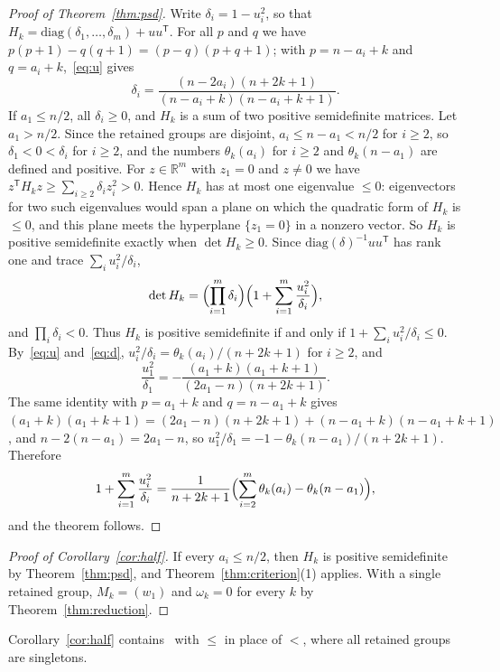 \documentclass[11pt]{amsart}
\theoremstyle{remark}
\numberwithin{equation}{section}
\newcommand{\R}{\mathbb R}
\begin{document}
\begin{proof}[Proof of Theorem~\ref{thm:psd}]
Write $\delta_i=1-u_i^2$, so that $H_k=\mathrm{diag}(\delta_1,\dots,\delta_m)+uu^{\mathsf T}$. For all $p$ and $q$ we have $p(p+1)-q(q+1)=(p-q)(p+q+1)$; with $p=n-a_i+k$ and $q=a_i+k$,~\eqref{eq:u} gives
\begin{equation}\label{eq:d}
\delta_i=\frac{(n-2a_i)(n+2k+1)}{(n-a_i+k)(n-a_i+k+1)}.
\end{equation}
If $a_1\le n/2$, all $\delta_i\ge0$, and $H_k$ is a sum of two positive semidefinite matrices. Let $a_1>n/2$. Since the retained groups are disjoint, $a_i\le n-a_1<n/2$ for $i\ge2$, so $\delta_1<0<\delta_i$ for $i\ge2$, and the numbers $\theta_k(a_i)$ for $i\ge2$ and $\theta_k(n-a_1)$ are defined and positive. For $z\in\R^m$ with $z_1=0$ and $z\ne0$ we have $z^{\mathsf T}H_kz\ge\sum_{i\ge2}\delta_iz_i^2>0$. Hence $H_k$ has at most one eigenvalue $\le0$: eigenvectors for two such eigenvalues would span a plane on which the quadratic form of $H_k$ is $\le0$, and this plane meets the hyperplane $\{z_1=0\}$ in a nonzero vector. So $H_k$ is positive semidefinite exactly when $\det H_k\ge0$. Since $\mathrm{diag}(\delta)^{-1}uu^{\mathsf T}$ has rank one and trace $\sum_iu_i^2/\delta_i$,
\[
\det H_k=\Bigl(\prod_{i=1}^m\delta_i\Bigr)\Bigl(1+\sum_{i=1}^m\frac{u_i^2}{\delta_i}\Bigr),
\]
and $\prod_i\delta_i<0$. Thus $H_k$ is positive semidefinite if and only if $1+\sum_iu_i^2/\delta_i\le0$. By~\eqref{eq:u} and~\eqref{eq:d}, $u_i^2/\delta_i=\theta_k(a_i)/(n+2k+1)$ for $i\ge2$, and
\[
\frac{u_1^2}{\delta_1}=-\frac{(a_1+k)(a_1+k+1)}{(2a_1-n)(n+2k+1)}.
\]
The same identity with $p=a_1+k$ and $q=n-a_1+k$ gives $(a_1+k)(a_1+k+1)=(2a_1-n)(n+2k+1)+(n-a_1+k)(n-a_1+k+1)$, and $n-2(n-a_1)=2a_1-n$, so $u_1^2/\delta_1=-1-\theta_k(n-a_1)/(n+2k+1)$. Therefore
\[
1+\sum_{i=1}^m\frac{u_i^2}{\delta_i}=\frac1{n+2k+1}\Bigl(\sum_{i=2}^m\theta_k(a_i)-\theta_k(n-a_1)\Bigr),
\]
and the theorem follows.
\end{proof}

\begin{proof}[Proof of Corollary~\ref{cor:half}]
If every $a_i\le n/2$, then $H_k$ is positive semidefinite by Theorem~\ref{thm:psd}, and Theorem~\ref{thm:criterion}(1) applies. With a single retained group, $M_k=(w_1)$ and $\omega_k=0$ for every $k$ by Theorem~\ref{thm:reduction}.
\end{proof}

Corollary~\ref{cor:half} contains~\cite[Corollary~4.15]{AP26} with $\le$ in place of $<$, where all retained groups are singletons.
\end{document}
